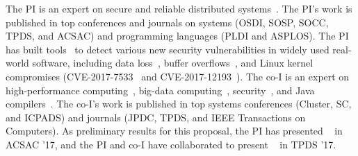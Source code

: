 The PI is an expert on secure and reliable distributed 
systems~\cite{smt:cacm, cui:tern:osdi10, peregrine:sosp11,
parrot:sosp13, crane:sosp15, tripod:apsys16, kakute:acsac17, apus:socc17,
confluence:tpds17, woodpecker:asplos13, wu:pldi12}. The PI's work is 
published in top conferences and journals on systems (OSDI, SOSP, 
SOCC, TPDS, and ACSAC) and programming languages (PLDI and ASPLOS). The PI has 
built tools~\cite{woodpecker:asplos13,wu:pldi12} to detect various 
new security vulnerabilities in widely used real-world software, including data 
loss~\cite{woodpecker:asplos13}, buffer overflows~\cite{wu:pldi12}, and Linux 
kernel compromises (CVE-2017-7533~\cite{cv3-2017-7533} and 
CVE-2017-12193~\cite{cve-2017-12193}). The co-I is an expert on 
high-performance computing~\cite{powerrock,hwang,jessica,cheung,khokhar,sheng, 
shengdi1}, big-data computing~\cite{confluence:tpds17,lai2013latency},  
security~\cite{clwang:secure:routing,clwang:gpass}, and Java 
compilers~\cite{rhymes,shengdi,jessica2}. The co-I's work is published in top 
systems conferences (Cluster, SC, and ICPADS) and journals (JPDC, TPDS, and IEEE 
Transactions on Computers). As preliminary results for this proposal, the PI has 
presented \kakute~\cite{kakute:acsac17} in ACSAC '17, and the PI and co-I have 
collaborated to present \confluence~\cite{confluence:tpds17} in TPDS '17.


